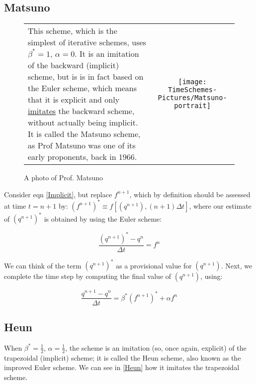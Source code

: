 \subsection{Matsuno}

\begin{figure}[h!]
	\begin{tabular}{lc}
		\begin{minipage}[c]{0.7\textwidth}
			This scheme, which is the simplest of iterative schemes, uses $\beta^*=1$, $\alpha=0$. It is an imitation of the backward (implicit) scheme, but is is in fact based on the Euler scheme, which means that it is explicit and only \underline{imitates} the backward scheme, without actually being implicit. It is called the Matsuno scheme, as Prof Matsuno was one of its early proponents, back in 1966. 
		\end{minipage}
		&
		\begin{minipage}{0.3\textwidth}
			\texttt{[image: TimeSchemes-Pictures/Matsuno-portrait]}
			\caption{A photo of Prof. Matsuno}
			\label{Fig:Matsuno-portrait}
		\end{minipage}
	\end{tabular}
\end{figure}

Consider eqn \ref{Implicit}, but replace $f^{n+1}$, which by definition should be assessed at time $t=n+1$ by: $\left(f^{n+1}\right)^* \equiv f \left[\left(q^{n+1}\right),\left(n+1\right)\Delta t\right]$, where our estimate of $\left(q^{n+1}\right)^*$ is obtained by using the Euler scheme:

\begin{equation}
	 \frac{ (q^{n+1})^*-q^n}{\Delta t} = f^n
	\label{Euler-predictor}
\end{equation}

We can think of the term $(q^{n+1})^*$ as a provisional value for $(q^{n+1})$.
Next, we complete the time step by computing the final value of $(q^{n+1})$, using:
	
\begin{equation}
	\frac{q^{n+1}-q^{n}}{\Delta t} = \beta^* \left(f^{n+1}\right)^* + \alpha f^n
	\label{corrector-Implicit}
\end{equation}

\subsection{Heun}
When $\beta^*=\frac{1}{2}$, $\alpha=\frac{1}{2}$, the scheme is an imitation (so, once again, explicit) of the trapezoidal (implicit) scheme; it is called the Heun scheme, also known as the improved Euler scheme. We can see in \ref{Heun} how it imitates the trapezoidal scheme.

